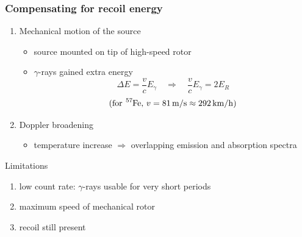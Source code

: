 	\begin{frame}
		\frametitle{Compensating for recoil energy}
		
		\begin{enumerate}
			\item Mechanical motion of the source
			\begin{itemize}
				\item source mounted on tip of high-speed rotor
				\item $\gamma$-rays gained extra energy
				\begin{equation*}
					\Delta E=\frac{v}{c} E_{\gamma}\quad \Rightarrow \quad \frac{v}{c}E_{\gamma}=2E_R
				\end{equation*}
				\begin{equation*}
					\text{(for } \ce{^{57}Fe} \text{, } v=\unit[81]{m/s}\approx\unit[292]{km/h} \text{)}
				\end{equation*}
			\end{itemize}
			\item Doppler broadening
			\begin{itemize}
				\item temperature increase $\Rightarrow$ overlapping emission and absorption spectra
			\end{itemize}
		\end{enumerate}
	
		\begin{block}{Limitations}
			\begin{enumerate}
				\item low count rate: $\gamma$-rays usable for very short periods
				\item maximum speed of mechanical rotor
				\item recoil still present
			\end{enumerate}
		\end{block}
		
	\end{frame}
	
